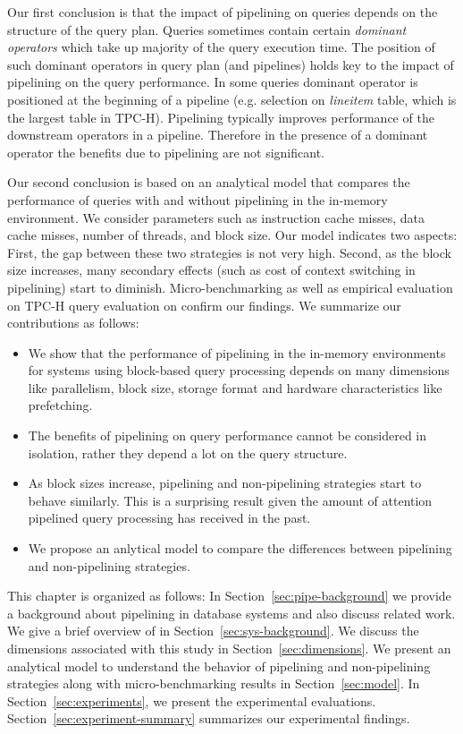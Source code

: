 Our first conclusion is that the impact of pipelining on queries depends on the structure of the query plan. 
Queries sometimes contain certain \textit{dominant operators} which take up majority of the query execution time.
The position of such dominant operators in query plan (and pipelines) holds key to the impact of pipelining on the query performance. 
In some queries dominant operator is positioned at the beginning of a pipeline (e.g. selection on \textit{lineitem} table, which is the largest table in TPC-H).
Pipelining typically improves performance of the downstream operators in a pipeline.
Therefore in the presence of a dominant operator the benefits due to pipelining are not significant. 

Our second conclusion is based on an analytical model that compares the performance of queries with and without pipelining in the in-memory environment. 
We consider parameters such as instruction cache misses, data cache misses, number of threads, and block size.
Our model indicates two aspects: First, the gap between these two strategies is not very high. 
Second, as the block size increases, many secondary effects (such as cost of context switching in pipelining) start to diminish.
Micro-benchmarking as well as empirical evaluation on TPC-H query evaluation on \sys{} confirm our findings. 
We summarize our contributions as follows:
\begin{itemize}
	\item We show that the performance of pipelining in the in-memory environments for systems using block-based query processing depends on many dimensions like parallelism, block size, storage format and hardware characteristics like prefetching. 
	\item The benefits of pipelining on query performance cannot be considered in isolation, rather they depend a lot on the query structure.
	\item As block sizes increase, pipelining and non-pipelining strategies start to behave similarly. This is a surprising result given the amount of attention pipelined query processing has received in the past. 
	\item We propose an anlytical model to compare the differences between pipelining and non-pipelining strategies.
\end{itemize}
This chapter is organized as follows: In Section~\ref{sec:pipe-background} we provide a background about pipelining in database systems and also discuss related work.
We give a brief overview of \sys{} in Section~\ref{sec:sys-background}.
We discuss the dimensions associated with this study in Section~\ref{sec:dimensions}.
We present an analytical model to understand the behavior of pipelining and non-pipelining strategies along with micro-benchmarking results in Section~\ref{sec:model}.
In Section~\ref{sec:experiments}, we present the experimental evaluations.
Section~\ref{sec:experiment-summary} summarizes our experimental findings.

